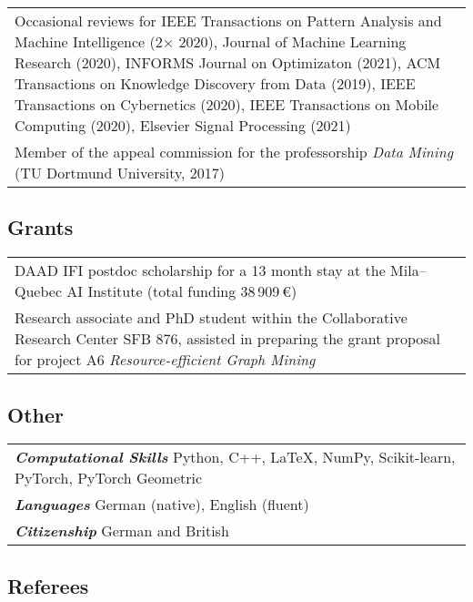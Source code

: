 \documentclass[11pt, a4paper, DIV=12]{scrartcl}
\begin{document}
\begin{tabular}{p{14.5cm}}


Occasional reviews for IEEE Transactions on Pattern Analysis and Machine Intelligence (2$\times$ 2020), Journal of Machine Learning Research (2020), INFORMS Journal on Optimizaton (2021), ACM Transactions on Knowledge Discovery from Data (2019), IEEE Transactions on Cybernetics (2020), IEEE Transactions on Mobile Computing (2020), Elsevier Signal Processing (2021)\\[0.5em]

Member of the appeal commission for the professorship \emph{Data Mining} (TU Dortmund University, 2017)
\end{tabular}

\subsection*{Grants}
\begin{tabular}{p{14.5cm}}
	DAAD IFI postdoc scholarship for a 13 month stay at the Mila--Quebec AI Institute (total funding 38\,909\,€)\\[0.5em]
	
	Research associate and PhD student  within the Collaborative Research Center SFB 876, assisted in preparing the  grant proposal for project A6 \emph{Resource-efficient Graph Mining}
\end{tabular}


\subsection*{Other}

\begin{tabular}{l}
	\textsf{\textbf{\em Computational Skills}} Python, C\hspace{-1pt}+\hspace{-1pt}+, \LaTeX, NumPy, Scikit-learn, PyTorch, PyTorch Geometric\\
	\textsf{\textbf{\em Languages}} German (native), English (fluent)\\
	\textsf{\textbf{\em Citizenship}} German and British
\end{tabular}





\subsection*{Referees}
\end{document}

